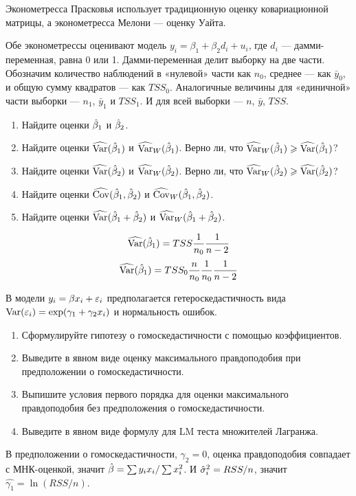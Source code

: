 \begin{problem}
Эконометресса Прасковья использует традиционную оценку ковариационной матрицы, а эконометресса Мелони — оценку Уайта.

Обе эконометрессы оценивают модель $y_i = \beta_1 + \beta_2 d_i + u_i$, где $d_i$ — дамми-переменная, равна 0 или 1. Дамми-переменная делит выборку на две части. Обозначим количество наблюдений в «нулевой» части как $n_0$, среднее — как $\bar y_0$, и общую сумму квадратов — как $TSS_0$. Аналогичные величины для «единичной» части выборки — $n_1$, $\bar y_1$ и $TSS_1$. И для всей выборки — $n$, $\bar y$, $TSS$.


  \begin{enumerate}
    \item Найдите оценки $\hat{\beta}_1$ и $\hat{\beta}_2$.
    \item Найдите оценки $\operatorname{\widehat{\operatorname{Var}}}(\hat{\beta}_1)$ и $\operatorname{\widehat{\operatorname{Var}}}_W(\hat{\beta}_1)$. Верно ли, что $\operatorname{\widehat{\operatorname{Var}}}_W(\hat{\beta}_1) \geqslant \operatorname{\widehat{\operatorname{Var}}}(\hat{\beta}_1)$?
    \item Найдите оценки $\operatorname{\widehat{\operatorname{Var}}}(\hat{\beta}_2)$ и $\operatorname{\widehat{\operatorname{Var}}}_W(\hat{\beta}_2)$. Верно ли, что $\operatorname{\widehat{\operatorname{Var}}}_W(\hat{\beta}_2) \geqslant \operatorname{\widehat{\operatorname{Var}}}(\hat{\beta}_2)$?
    \item Найдите оценки $\operatorname{\widehat{\operatorname{Cov}}}(\hat{\beta}_1, \hat{\beta}_2)$ и $\operatorname{\widehat{\operatorname{Cov}}}_W(\hat{\beta}_1, \hat{\beta}_2)$.
    \item Найдите оценки $\operatorname{\widehat{\operatorname{Var}}}(\hat{\beta}_1 + \hat{\beta}_2)$ и $\operatorname{\widehat{\operatorname{Var}}}_W(\hat{\beta}_1 + \hat{\beta}_2)$.
  \end{enumerate}

\begin{sol}
\[
\operatorname{\widehat{\operatorname{Var}}}(\hat{\beta}_1) = TSS \frac{1}{n_0}\frac{1}{n-2}
\]
\[
\operatorname{\widehat{\operatorname{Var}}}(\hat{\beta}_1) = TSS_0\frac{n}{n_0} \frac{1}{n_0}\frac{1}{n-2}
\]
\end{sol}
\end{problem}



\begin{problem}
В модели $y_i=\beta x_i+\varepsilon_i$ предполагается гетероскедастичность вида $\operatorname{Var}(\varepsilon_i)=\exp(\gamma_1+\gamma_2 x_i)$ и нормальность ошибок.
\begin{enumerate}
\item Сформулируйте гипотезу о гомоскедастичности с помощью коэффициентов.
\item Выведите в явном виде оценку максимального правдоподобия при предположении о гомоскедастичности.
\item Выпишите условия первого порядка для оценки максимального правдоподобия без предположения о гомоскедастичности.
\item Выведите в явном виде формулу для LM теста множителей Лагранжа.
\end{enumerate}


\begin{sol}
В предположении о гомоскедастичности, $\gamma_2=0$, оценка правдоподобия совпадает с МНК-оценкой, значит $\hat{\beta}=\sum y_i x_i/ \sum x_i^2$. И $\hat{\sigma}^2_i=RSS/n$, значит $\hat{\gamma_1}=\ln(RSS/n)$.
\end{sol}
\end{problem}

